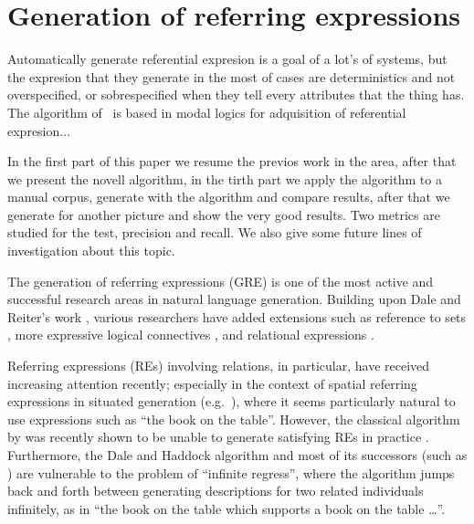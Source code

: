 \section{Generation of referring expressions}\label{sec:gre}


Automatically generate referential expresion is a goal of a lot's of systems, but the expresion that they generate in the most of cases are deterministics and not overspecified, or sobrespecified when they tell every attributes that the thing has.
The algorithm of~\cite{areces08} is based in modal logics for adquisition of referential expresion...

In the first part of this paper we resume the previos work in the area, after that we present the novell algorithm, in the tirth part we apply the algorithm to a manual corpus, generate with the algorithm and compare results, after that we generate for another picture and show the very good results. Two metrics are studied for the test, precision and recall. We also give some future lines of investigation about this topic.  


\cite{paig:thre87}

The generation of referring expressions (GRE) is one of the most
active and successful research areas in natural language generation.
Building upon Dale and Reiter's work \cite{dale89cooking,Dale1995},
various researchers have added extensions such as reference to sets
\cite{Stone2000}, more expressive logical connectives
\cite{deemter02:_gener_refer_expres}, and relational expressions
\cite{dale91:_gener_refer_expres_invol_relat}.

Referring expressions (REs) involving relations, in particular, have
received increasing attention recently; especially in the context of
spatial referring expressions in situated generation (e.g.\
\cite{kelleher06:_increm_gener_of_spatial_refer}), where it seems
particularly natural to use expressions such as ``the book on the
table''.  However, the classical algorithm by
 was recently shown to
be unable to generate satisfying REs in practice
\cite{viethen06:_algor_for_gener_refer_expres}.  Furthermore, the Dale
and Haddock algorithm and most of its successors (such as
\cite{kelleher06:_increm_gener_of_spatial_refer}) are vulnerable to
the problem of ``infinite regress'', where the algorithm jumps back
and forth between generating descriptions for two related individuals
infinitely, as in ``the book on the table which supports a book on the
table \ldots''.


